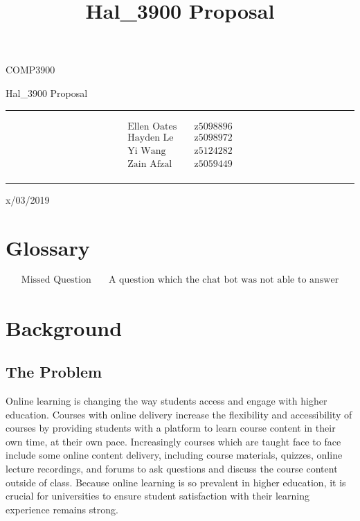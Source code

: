 \documentclass{article}
\title{Hal\_3900 Proposal}
\begin{document}
\begin{LARGE}
\begin{center}
\vspace*{15mm}

COMP3900

Hal\_3900 Proposal

\rule[4.5pt]{0.61\textwidth}{0.3pt}

\begin{align*}
  \text{Ellen Oates}    \quad   &\text{z5098896} \\
  \text{Hayden Le}      \quad   &\text{z5098972} \\
  \text{Yi Wang}        \quad   &\text{z5124282} \\
  \text{Zain Afzal}     \quad   &\text{z5059449} \\
\end{align*}

\rule[4.5pt]{0.61\textwidth}{0.3pt}

x/03/2019

\end{center}
\end{LARGE}
\newpage


\section{Glossary}
\begin{align*}
  \text{Missed Question}    \quad   &\text{A question which the chat bot was not able to answer}
\end{align*}

\section{Background}
\subsection{The Problem}

Online learning is changing the way students access and engage with higher education. Courses with 
online delivery increase the flexibility and accessibility of courses by providing students
with a platform to learn course content in their own time, at their own pace. Increasingly courses which are 
taught face to face include some online content delivery, including course materials, quizzes, online lecture recordings,
and forums to ask questions and discuss the course content outside of class. Because online learning is so prevalent in 
higher education, it is crucial for universities to ensure student satisfaction with their learning experience remains strong. 
\end{document}
